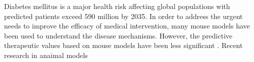 Diabetes mellitus is a major health risk affecting global populations with predicted patients exceed 590 million by 2035. \cite{IDF_Diabetes_Atlas_Group_2015} In order to address the urgent needs to improve the efficacy of medical intervention, many mouse models have been used to understand the disease mechanisms. However, the predictive therapeutic values based on mouse models have been less significant \cite{Renner_2016, Hay_2014}. Recent research in anaimal models 

